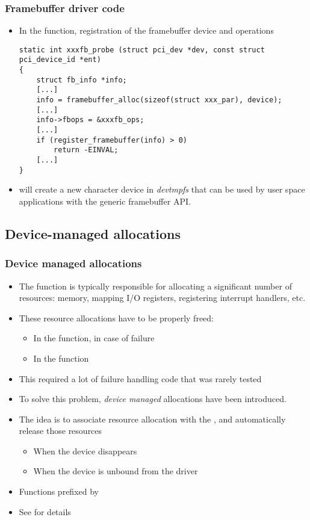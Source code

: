 \begin{frame}[fragile]
  \frametitle{Framebuffer driver code}
  \begin{itemize}
  \item In the  function, registration of the
    framebuffer device and operations
  \begin{verbatim}
static int xxxfb_probe (struct pci_dev *dev, const struct pci_device_id *ent)
{
    struct fb_info *info;
    [...]
    info = framebuffer_alloc(sizeof(struct xxx_par), device);
    [...]
    info->fbops = &xxxfb_ops;
    [...]
    if (register_framebuffer(info) > 0)
        return -EINVAL;
    [...]
}
  \end{verbatim}
  \item {} will create a new character device
    in {\em devtmpfs} that can be used by user space applications
    with the generic framebuffer API.
\end{itemize}
\end{frame}

\subsection{Device-managed allocations}

\begin{frame}
  \frametitle{Device managed allocations}
  \begin{itemize}
  \item The  function is typically responsible for
    allocating a significant number of resources: memory, mapping I/O
    registers, registering interrupt handlers, etc.
  \item These resource allocations have to be properly freed:
    \begin{itemize}
    \item In the  function, in case of failure
    \item In the  function
    \end{itemize}
  \item This required a lot of failure handling code that was rarely
    tested
  \item To solve this problem, {\em device managed} allocations have
    been introduced.
  \item The idea is to associate resource allocation with the
    , and automatically release those resources
    \begin{itemize}
    \item When the device disappears
    \item When the device is unbound from the driver
    \end{itemize}
  \item Functions prefixed by 
  \item See  for details
  \end{itemize}
\end{frame}

